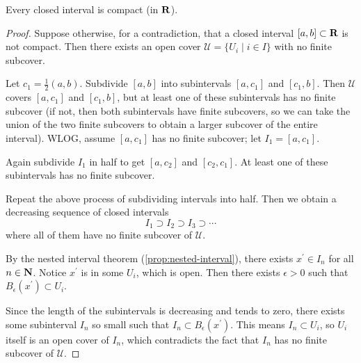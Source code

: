 \begin{lemma}
Every closed interval is compact (in $\mathbf R$).
\end{lemma}

\begin{figure}[H]
\centering
{}
\end{figure}

\begin{proof}
Suppose otherwise, for a contradiction, that a closed interval $[a,b]\subset\mathbf R$ is not compact. Then there exists an open cover $\mathcal{U}=\{U_i\mid i\in I\}$ with no finite subcover.

Let $c_1=\frac{1}{2}(a,b)$. Subdivide $[a,b]$ into subintervals $[a,c_1]$ and $[c_1,b]$. Then $\mathcal{U}$ covers $[a,c_1]$ and $[c_1,b]$, but at least one of these subintervals has no finite subcover (if not, then both subintervals have finite subcovers, so we can take the union of the two finite subcovers to obtain a larger subcover of the entire interval). WLOG, assume $[a,c_1]$ has no finite subcover; let $I_1=[a,c_1]$.

Again subdivide $I_1$ in half to get $[a,c_2]$ and $[c_2,c_1]$. At least one of these subintervals has no finite subcover.

Repeat the above process of subdividing intervals into half. Then we obtain a decreasing sequence of closed intervals
\[I_1\supset I_2\supset I_3\supset\cdots\]
where all of them have no finite subcover of $\mathcal{U}$.

By the nested interval theorem (\cref{prop:nested-interval}), there exists $x^\prime\in I_n$ for all $n\in\mathbf N$. Notice $x^\prime$ is in some $U_i$, which is open. Then there exists $\epsilon>0$ such that $B_\epsilon(x^\prime)\subset U_i$.

Since the length of the subintervals is decreasing and tends to zero, there exists some subinterval $I_n$ so small such that $I_n\subset B_\epsilon(x^\prime)$. This means $I_n\subset U_i$, so $U_i$ itself is an open cover of $I_n$, which contradicts the fact that $I_n$ has no finite subcover of $\mathcal{U}$.
\end{proof}


